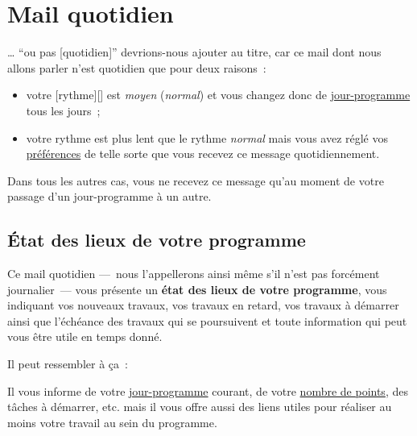 % 
% 
% 
% 
% 
% 
% 
% 

\section{Mail quotidien}\hypertarget{mail-quotidien}{}\label{mail-quotidien}

… ``ou pas [quotidien]'' devrions-nous ajouter au titre, car ce mail dont nous allons parler n'est quotidien que pour deux raisons~{}:

\begin{itemize}
\item votre [rythme][] est \emph{moyen} (\emph{normal}) et vous changez donc de \hyperlink{explicationjourprogrammejourreel}{jour-programme} tous les jours~{};
\item votre rythme est plus lent que le rythme \emph{normal} mais vous avez réglé vos \hyperlink{preferences-auteur}{préférences} de telle sorte que vous recevez ce message quotidiennement.
\end{itemize}

Dans tous les autres cas, vous ne recevez ce message qu'au moment de votre passage d'un jour-programme à un autre.

\subsection{État des lieux de votre programme}\hypertarget{tat-des-lieux-de-votre-programme}{}\label{tat-des-lieux-de-votre-programme}

Ce mail quotidien —~{}nous l'appellerons ainsi même s'il n'est pas forcément journalier~{}— vous présente un \textbf{état des lieux de votre programme}, vous indiquant vos nouveaux travaux, vos travaux en retard, vos travaux à démarrer ainsi que l'échéance des travaux qui se poursuivent et toute information qui peut vous être utile en temps donné.

Il peut ressembler à ça~{}:

\begin{center}
\end{center}

Il vous informe de votre \hyperlink{explicationjourprogrammejourreel}{jour-programme} courant, de votre \hyperlink{explication-nombre-points}{nombre de points}, des tâches à démarrer, etc. mais il vous offre aussi des liens utiles pour réaliser au moins votre travail au sein du programme.


